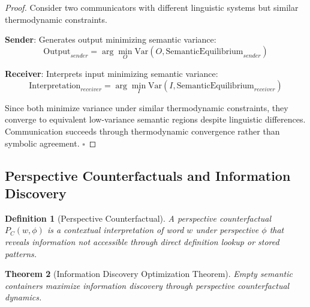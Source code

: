 \documentclass[11pt,a4paper]{article}
\newtheorem{theorem}{Theorem}[section]
\newtheorem{definition}[theorem]{Definition}
\begin{document}
\begin{proof}
Consider two communicators with different linguistic systems but similar thermodynamic constraints. 

\textbf{Sender}: Generates output minimizing semantic variance:
\begin{equation}
\text{Output}_{sender} = \arg\min_{O} \text{Var}(O, \text{SemanticEquilibrium}_{sender})
\end{equation}

\textbf{Receiver}: Interprets input minimizing semantic variance:
\begin{equation}
\text{Interpretation}_{receiver} = \arg\min_{I} \text{Var}(I, \text{SemanticEquilibrium}_{receiver})
\end{equation}

Since both minimize variance under similar thermodynamic constraints, they converge to equivalent low-variance semantic regions despite linguistic differences. Communication succeeds through thermodynamic convergence rather than symbolic agreement. $\square$
\end{proof}

\subsection{Perspective Counterfactuals and Information Discovery}

\begin{definition}[Perspective Counterfactual]
A perspective counterfactual $P_C(w,\phi)$ is a contextual interpretation of word $w$ under perspective $\phi$ that reveals information not accessible through direct definition lookup or stored patterns.
\end{definition}

\begin{theorem}[Information Discovery Optimization Theorem]
Empty semantic containers maximize information discovery through perspective counterfactual dynamics.
\end{theorem}
\end{document}
